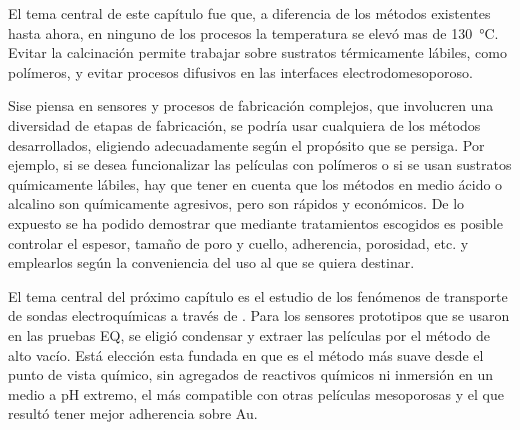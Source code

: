 	El tema central de este capítulo fue que, a diferencia de los métodos existentes hasta ahora, en ninguno de los procesos la temperatura se elevó mas de \SI{130}{\celsius}. Evitar la calcinación permite trabajar sobre sustratos térmicamente lábiles, como polímeros, y evitar procesos difusivos en las interfaces electrodo\textbar mesoporoso. 

	Si\space se piensa en sensores y procesos de fabricación complejos, que involucren una diversidad de etapas de fabricación, se podría usar cualquiera de los métodos desarrollados, eligiendo adecuadamente según el propósito que se persiga. Por ejemplo, si se desea funcionalizar las películas con polímeros o si se usan sustratos químicamente lábiles, hay que tener en cuenta que los métodos en medio ácido o alcalino son químicamente agresivos, pero son rápidos y económicos. De lo expuesto se ha podido demostrar que mediante tratamientos escogidos es posible controlar el espesor, tamaño de poro y cuello, adherencia, porosidad, etc. y emplearlos según la conveniencia del uso al que se quiera destinar.

	El tema central del próximo capítulo es el estudio de los fenómenos de transporte de sondas electroquímicas a través de \pdm. Para los sensores prototipos que se usaron en las pruebas EQ, se eligió condensar y extraer las películas por el método de alto vacío. Está elección esta fundada en que es el método más suave desde el punto de vista químico, sin agregados de reactivos químicos ni inmersión en un medio a pH extremo, el más compatible con otras películas mesoporosas y el que resultó tener mejor adherencia sobre Au. 			 
